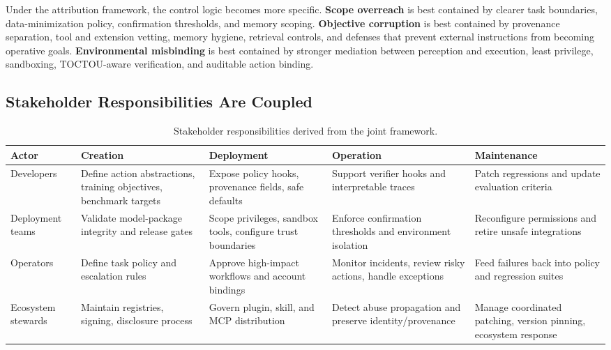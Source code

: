 Under the attribution framework, the control logic becomes more specific. \textbf{Scope overreach} is best contained by clearer task boundaries, data-minimization policy, confirmation thresholds, and memory scoping. \textbf{Objective corruption} is best contained by provenance separation, tool and extension vetting, memory hygiene, retrieval controls, and defenses that prevent external instructions from becoming operative goals. \textbf{Environmental misbinding} is best contained by stronger mediation between perception and execution, least privilege, sandboxing, TOCTOU-aware verification, and auditable action binding.

\subsection{Stakeholder Responsibilities Are Coupled}

\begin{table}[!t]
\centering
\scriptsize
\caption{Stakeholder responsibilities derived from the joint framework.}
\label{tab:actor_control_matrix}
\renewcommand{\arraystretch}{1.08}
\setlength{\tabcolsep}{3.5pt}
\begin{tabularx}{\textwidth}{L{1.8cm} L{2.8cm} L{2.8cm} L{2.8cm} Y}
\toprule
\textbf{Actor} & \textbf{Creation} & \textbf{Deployment} & \textbf{Operation} & \textbf{Maintenance} \\
\midrule
Developers & Define action abstractions, training objectives, benchmark targets & Expose policy hooks, provenance fields, safe defaults & Support verifier hooks and interpretable traces & Patch regressions and update evaluation criteria \\
Deployment teams & Validate model-package integrity and release gates & Scope privileges, sandbox tools, configure trust boundaries & Enforce confirmation thresholds and environment isolation & Reconfigure permissions and retire unsafe integrations \\
Operators & Define task policy and escalation rules & Approve high-impact workflows and account bindings & Monitor incidents, review risky actions, handle exceptions & Feed failures back into policy and regression suites \\
Ecosystem stewards & Maintain registries, signing, disclosure process & Govern plugin, skill, and MCP distribution & Detect abuse propagation and preserve identity/provenance & Manage coordinated patching, version pinning, ecosystem response \\
\bottomrule
\end{tabularx}
\end{table}

